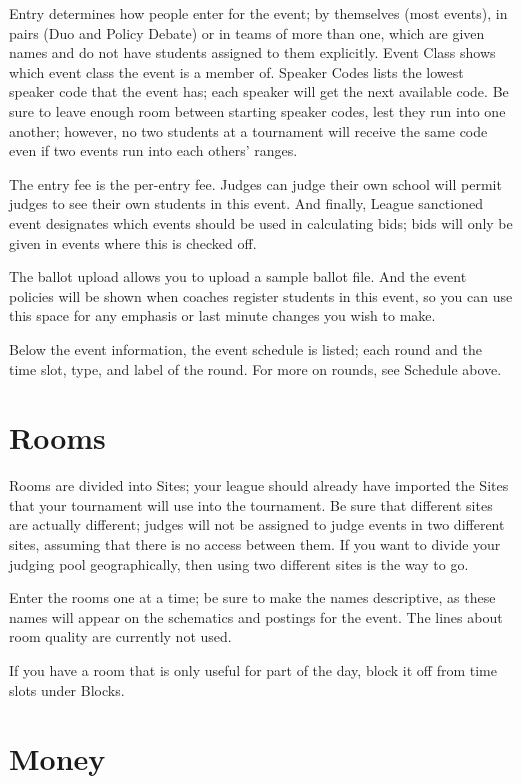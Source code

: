 \documentclass[12pt]{report} \usepackage {fullpage} \usepackage{times}
\begin{document}
Entry determines how people enter for the event; by themselves (most
events), in pairs (Duo and Policy Debate) or in teams of more than one,
which are given names and do not have students assigned to them explicitly.
Event Class shows which event class the event is a member of.   Speaker
Codes lists the lowest speaker code that the event has; each speaker will
get the next available code.   Be sure to leave enough room between
starting speaker codes, lest they run into one another; however, no two
students at a tournament will receive the same code even if two events run
into each others' ranges.

The entry fee is the per-entry fee.   Judges can judge their own school
will permit judges to see their own students in this event.   And finally,
League sanctioned event designates which events should be used in
calculating bids; bids will only be given in events where this is checked
off.

The ballot upload allows you to upload a sample ballot file.  And the event
policies will be shown when coaches register students in this event, so you
can use this space for any emphasis or last minute changes you wish to
make.

Below the event information, the event schedule is listed;  each round and
the time slot, type, and label of the round.  For more on rounds, see
Schedule above.

 	
\section{Rooms}

Rooms are divided into Sites;  your league should already have imported the
Sites that your tournament will use into the tournament.  Be sure that
different sites are actually different; judges will not be assigned to
judge events in two different sites, assuming that there is no access
between them.   If you want to divide your judging pool geographically,
then using two different sites is the way to go.

Enter the rooms one at a time; be sure to make the names descriptive, as
these names will appear on the schematics and postings for the event.
The lines about room quality are currently not used.

If you have a room that is only useful for part of the day, block it off
from time slots under Blocks.

 	
\section{Money}
\end{document}
